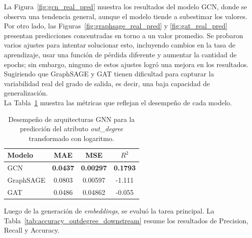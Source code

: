 La Figura~\ref{fig:gcn_real_pred} muestra los resultados del modelo GCN, donde se observa una tendencia general, aunque el modelo tiende a subestimar los valores. Por otro lado, las Figuras~\ref{fig:graphsage_real_pred} y \ref{fig:gat_real_pred} presentan predicciones concentradas en torno a un valor promedio. Se probaron varios ajustes para intentar solucionar esto, incluyendo cambios en la tasa de aprendizaje, usar una función de pérdida diferente  y aumentar la cantidad de epochs; sin embargo, ninguno de estos ajustes logró una mejora en los resultados. Sugiriendo que GraphSAGE y GAT tienen dificultad para capturar la variabilidad real del grado de salida, es decir, una baja capacidad de generalización.\\



La Tabla~\ref{tab:resultados_regresion_outdegree} muestra las métricas que reflejan el desempeño de cada modelo.\\

\begin{table}[H]
\centering
\caption{Desempeño de arquitecturas GNN para la predicción del atributo \textit{out\_degree} transformado con logaritmo.}
\label{tab:resultados_regresion_outdegree}
\begin{tabular}{lccc}
\toprule
\textbf{Modelo} & \textbf{MAE} & \textbf{MSE} & \textbf{$R^2$} \\
\midrule
GCN        & \textbf{0.0437}  & \textbf{0.00297}  & \textbf{0.1793} \\
GraphSAGE  & 0.0803  & 0.00597  & -1.111 \\
GAT        & 0.0486  & 0.04862  & -0.055  \\
\bottomrule
\end{tabular}
\end{table}



Luego de la generación de \textit{embeddings}, se evaluó la tarea principal. La Tabla~\ref{tab:accuracy_outdegree_downstream} resume los resultados de Precision, Recall y Accuracy.

\begin{table}[H]
\centering
{}
\caption{Resultados de Precision, Recall y Accuracy (\%) por modelo GNN bajo dos configuraciones: sin balanceo de clases (`NoBatch-NoW') y con balanceo de clases (`NoBatch-W').}
\label{tab:accuracy_outdegree_downstream}
\end{table}



